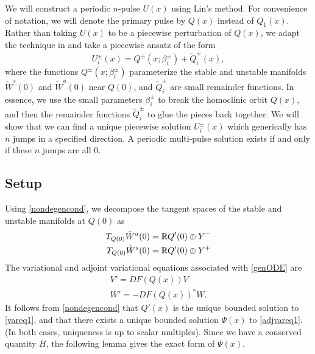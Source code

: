 \documentclass[10pt,reqno]{amsart}
\theoremstyle{plain}
\theoremstyle{definition}
\theoremstyle{remark}
\numberwithin{theorem}{section}
\numberwithin{equation}{section}
\begin{document}
We will construct a periodic $n$-pulse $U(x)$ using Lin's method. For convenience of notation, we will denote the primary pulse by $Q(x)$ instead of $Q_1(x)$. Rather than taking $U(x)$ to be a piecewise perturbation of $Q(x)$, we adapt the technique in \cite{Sandstede1997} and take a piecewise ansatz of the form
\[
U_i^\pm(x) = Q^\pm(x; \beta_i^\pm) + \tilde{Q}_i^\pm(x),
\]
where the functions $Q^\pm(x; \beta_i^\pm)$ parameterize the stable and unstable manifolds $\tilde{W}^s(0)$ and $\tilde{W}^u(0)$ near $Q(0)$, and $\tilde{Q}_i^\pm$ are small remainder functions. In essence, we use the small parameters $\beta_i^\pm$ to break the homoclinic orbit $Q(x)$, and then the remainder functions $\tilde{Q}_i^\pm$ to glue the pieces back together. We will show that we can find a unique piecewise solution $U_i^\pm(x)$ which generically has $n$ jumps in a specified direction. A periodic multi-pulse solution exists if and only if these $n$ jumps are all 0.

\subsection{Setup}

Using \cref{nondegencond}, we decompose the tangent spaces of the stable and unstable manifolds at $Q(0)$ as 
\begin{equation*}
\begin{aligned}
T_{Q(0)}\tilde{W}^u(0) &= \mathbb{R} Q'(0) \oplus Y^- \\
T_{Q(0)}\tilde{W}^s(0) &= \mathbb{R} Q'(0) \oplus Y^+
\end{aligned}
\end{equation*}
The variational and adjoint variational equations associated with \cref{genODE} are
\begin{align}
V' = DF(Q(x)) V \label{vareq1} \\
W' = -DF(Q(x))^* W \label{adjvareq1}.
\end{align}
It follows from \cref{nondegencond} that $Q'(x)$ is the unique bounded solution to \cref{vareq1}, and that there exists a unique bounded solution $\Psi(x)$ to \cref{adjvareq1}. (In both cases, uniqueness is up to scalar multiples). Since we have a conserved quantity $H$, the following lemma gives the exact form of $\Psi(x)$.
\end{document}
